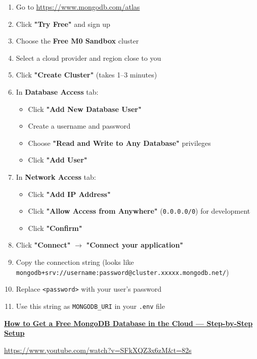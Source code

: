 \documentclass[12pt,a4paper]{article}
\begin{document}
\begin{enumerate}[leftmargin=*,itemsep=0.5em]
    \item Go to \url{https://www.mongodb.com/atlas}
    \item Click \textbf{"Try Free"} and sign up
    \item Choose the \textbf{Free M0 Sandbox} cluster
    \item Select a cloud provider and region close to you
    \item Click \textbf{"Create Cluster"} (takes 1--3 minutes)
    \item In \textbf{Database Access} tab:
    \begin{itemize}
        \item Click \textbf{"Add New Database User"}
        \item Create a username and password
        \item Choose \textbf{"Read and Write to Any Database"} privileges
        \item Click \textbf{"Add User"}
    \end{itemize}
    \item In \textbf{Network Access} tab:
    \begin{itemize}
        \item Click \textbf{"Add IP Address"}
        \item Click \textbf{"Allow Access from Anywhere"} (\texttt{0.0.0.0/0}) for development
        \item Click \textbf{"Confirm"}
    \end{itemize}
    \item Click \textbf{"Connect"} $\rightarrow$ \textbf{"Connect your application"}
    \item Copy the connection string (looks like \texttt{mongodb+srv://username:password@cluster.xxxxx.mongodb.net/})
    \item Replace \texttt{<password>} with your user's password
    \item Use this string as \texttt{MONGODB\_URI} in your \texttt{.env} file
\end{enumerate}

\begin{tcolorbox}[colback=infobox,colframe=primaryblue,title= YouTube Tutorial]
    \href{https://www.youtube.com/watch?v=SFkXQZ3x6zM&t=82s}{\textbf{How to Get a Free MongoDB Database in the Cloud — Step-by-Step Setup}}
    
    \url{https://www.youtube.com/watch?v=SFkXQZ3x6zM&t=82s}
\end{tcolorbox}
\end{document}
